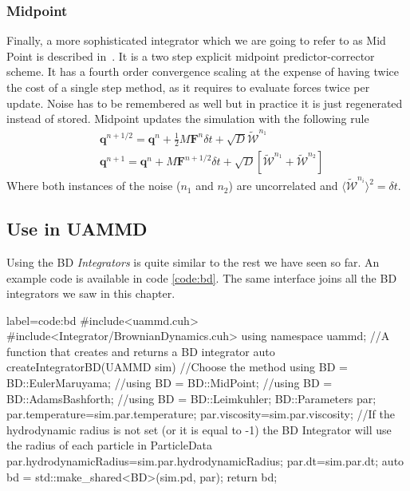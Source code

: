 \documentclass[ twoside,openright,titlepage,numbers=noenddot,%
headinclude,footinclude,cleardoublepage=empty,abstract=on,
BCOR=5mm,paper=b5,fontsize=11pt, dvipsnames
]{scrreprt}
\renewcommand{\vec}[1]{\bm{#1}}
\newcommand{\dt}{\delta t}
\newcommand{\half}{\frac{1}{2}}
\newcommand{\noise}{\widetilde{W}}
\newcommand{\ppos}{q}
\begin{document}
\subsubsection*{Midpoint}
Finally, a more sophisticated integrator which we are going to refer to as Mid Point is described in~\cite{Delong2013}. 
It is a two step explicit midpoint predictor-corrector scheme. It has a fourth order convergence scaling at the expense of having twice the cost of a single step method, as it requires to evaluate forces twice per update. Noise has to be remembered as well but in practice it is just regenerated instead of stored.
Midpoint updates the simulation with the following rule
\begin{equation}
  \begin{aligned}
    &\vec{\ppos}^{n+1/2} = \vec{\ppos}^n + \half M\vec{F}^n\dt + \sqrt{D}\vec{\mathcal{\noise}}^{n_1}\\
    &\vec{\ppos}^{n+1} = \vec{\ppos}^n + M\vec{F}^{n+1/2}\dt + \sqrt{D}\left[\vec{\mathcal{\noise}}^{n_1}  + \vec{\mathcal{\noise}}^{n_2}\right]
  \end{aligned}
\end{equation}
Where both instances of the noise ($n_1$ and $n_2$) are uncorrelated and $\langle \mathcal{\noise}^{n_i}\rangle^2 = \dt$.
\subsection*{Use in UAMMD}
Using the \gls{BD} \emph{Integrators} is quite similar to the rest we have seen so far. An example code is available in code \ref{code:bd}. The same interface joins all the \gls{BD} integrators we saw in this chapter.
\begin{code2}{label=code:bd}
#include<uammd.cuh>
#include<Integrator/BrownianDynamics.cuh>
using namespace uammd;
//A function that creates and returns a BD integrator
auto createIntegratorBD(UAMMD sim){   
  //Choose the method
  using BD = BD::EulerMaruyama;
  //using BD = BD::MidPoint;
  //using BD = BD::AdamsBashforth;
  //using BD = BD::Leimkuhler;
  BD::Parameters par;
  par.temperature=sim.par.temperature;
  par.viscosity=sim.par.viscosity;
  //If the hydrodynamic radius is not set (or it is equal to -1) the BD Integrator will use the radius of each particle in ParticleData
  par.hydrodynamicRadius=sim.par.hydrodynamicRadius;
  par.dt=sim.par.dt;
  auto bd = std::make_shared<BD>(sim.pd, par);
  return bd;
}
\end{code2}
\end{document}
